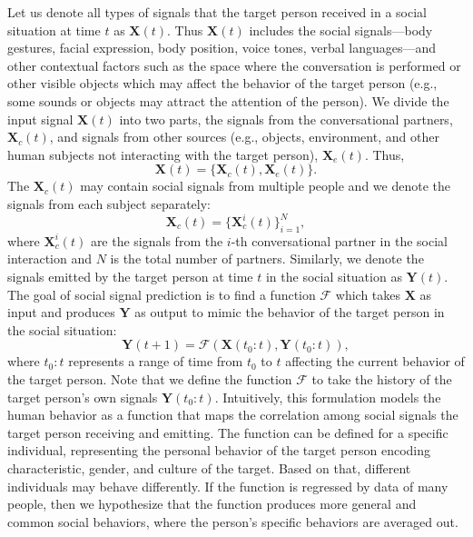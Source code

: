 Let us denote all types of signals that the target person received in a social situation at time $t$ as $\mathbf{X}(t)$. Thus $\mathbf{X}(t)$ includes the social signals---body gestures, facial expression, body position, voice tones, verbal languages---and other contextual factors such as the space where the conversation is performed or other visible objects which may affect the behavior of the target person (e.g., some sounds or objects may attract the attention of the person). We divide the input signal $\mathbf{X}(t)$ into two parts, the signals from the conversational partners, $\mathbf{X}_c(t)$, and signals from other sources (e.g., objects, environment, and other human subjects not interacting with the target person), $\mathbf{X}_e(t)$.  Thus,
\begin{equation}
\mathbf{X} (t) = \{  \mathbf{X}_c (t), \mathbf{X}_e (t)\}.
\end{equation}
The $\mathbf{X}_c (t)$ may contain social signals from multiple people and we denote the signals from each subject separately:
\begin{equation}
\mathbf{X}_c (t) = \{ \mathbf{X}_c^i (t) \}_{i=1}^N,
\end{equation}
where $\mathbf{X}^i_c (t)$ are the signals from the $i$-th conversational partner in the social interaction and $N$ is the total number of partners. 
Similarly, we denote the signals emitted by the target person at time $t$ in the social situation as $\mathbf{Y} (t)$.
The goal of social signal prediction is to find a function $\mathcal{F}$ which takes $\mathbf{X}$ as input and produces $\mathbf{Y}$ as output to mimic the behavior of the target person in the social situation:
\begin{equation}
\mathbf{Y} (t+1) = \mathcal{F} \left( \mathbf{X} (t_0:t), \mathbf{Y} (t_0:t) \right),
\label{equation:socialPrediction_1}
\end{equation}
where $t_0:t$ represents a range of time from $t_0$ to $t$ affecting the current behavior of the target person. Note that we define the function $\mathcal{F}$ to take the history of the target person's own signals $\mathbf{Y} (t_0:t)$. Intuitively, this formulation models the human behavior as a function that maps the correlation among social signals the target person receiving and emitting. The function can be defined for a specific individual, representing the personal behavior of the target person encoding characteristic, gender, and culture of the target. Based on that, different individuals may behave differently. If the function is regressed by data of many people, then we hypothesize that the function produces more general and common social behaviors, where the person's specific behaviors are averaged out.

